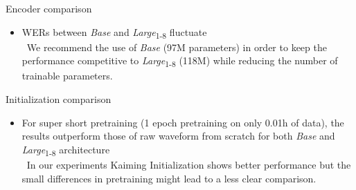 \begin{frame}{Encoder comparison}
    
\begin{itemize}
    \item WERs between \textit{Base} and \textit{Large}\textsubscript{1-8} fluctuate
    \\ \textrightarrow \,
    We recommend the use of \textit{Base} (97M parameters) in order to keep the performance competitive to \textit{Large}\textsubscript{1-8} (118M) while reducing the number of trainable parameters.
\end{itemize}
\end{frame}


\begin{frame}{Initialization comparison}
    
    
\begin{itemize}
    \item For super short pretraining (1 epoch pretraining on only 0.01h of data), the results outperform those of raw waveform from scratch for both \textit{Base} and \textit{Large}\textsubscript{1-8} architecture
    \\ \textrightarrow \,
    In our experiments Kaiming Initialization shows better performance but the small differences in pretraining might lead to a less clear comparison.
\end{itemize}

\end{frame}